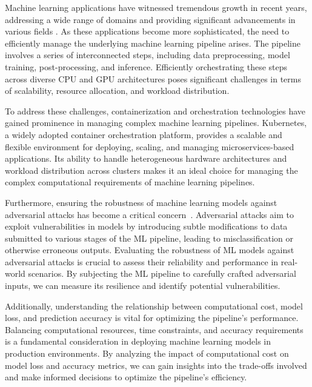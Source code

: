 \documentclass[conference]{IEEEtran}
\begin{document}
Machine learning applications have witnessed tremendous growth in recent years, addressing a wide range of domains and providing significant advancements in various fields \cite{li_general_2016, croce_reliable_2020, athalye_obfuscated_2018}. As these applications become more sophisticated, the need to efficiently manage the underlying machine learning pipeline arises. The pipeline involves a series of interconnected steps, including data preprocessing, model training, post-processing, and inference. Efficiently orchestrating these steps across diverse CPU and GPU architectures poses significant challenges in terms of scalability, resource allocation, and workload distribution.

To address these challenges, containerization and orchestration technologies have gained prominence in managing complex machine learning pipelines. Kubernetes, a widely adopted container orchestration platform, provides a scalable and flexible environment for deploying, scaling, and managing microservices-based applications. Its ability to handle heterogeneous hardware architectures and workload distribution across clusters makes it an ideal choice for managing the complex computational requirements of machine learning pipelines.

Furthermore, ensuring the robustness of machine learning  models against adversarial attacks has become a critical concern~\cite{adversarialpatch, carlini_towards_2017, croce_reliable_2020, hopskipjump, chakraborty2018adversarial, art2018}. Adversarial attacks aim to exploit vulnerabilities in models by introducing subtle modifications to data submitted to various stages of the ML pipeline, leading to misclassification or otherwise erroneous outputs. Evaluating the robustness of ML models against adversarial attacks is crucial to assess their reliability and performance in real-world scenarios. By subjecting the ML pipeline to carefully crafted adversarial inputs, we can measure its resilience and identify potential vulnerabilities.

Additionally, understanding the relationship between computational cost, model loss, and prediction accuracy is vital for optimizing the pipeline's performance. Balancing computational resources, time constraints, and accuracy requirements is a fundamental consideration in deploying machine learning models in production environments. By analyzing the impact of computational cost on model loss and accuracy metrics, we can gain insights into the trade-offs involved and make informed decisions to optimize the pipeline's efficiency.
\end{document}
